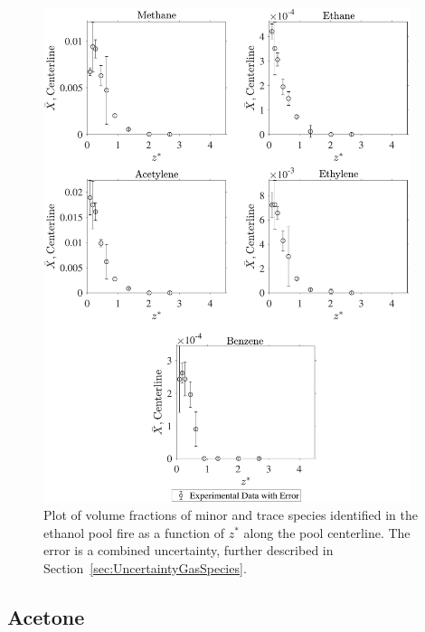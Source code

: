 \documentclass[12pt]{article}
\begin{document}
\begin{figure}[!h]
	\centering
\includegraphics[width=10.75cm,keepaspectratio]{Ethanol_Inter_MOL_FRAC_Plot.pdf}
	\caption[Volume fractions of minor and trace species in the ethanol plume]{Plot of volume fractions of minor and trace species identified in the ethanol pool fire as a function of $z^{*}$ along the pool centerline. The error is a combined uncertainty, further described in Section~\ref{sec:UncertaintyGasSpecies}.}
	\label{fig:Ethanol_VOL_Frac_Inter}
\end{figure}

\clearpage
\subsection{Acetone}
\label{ssec:Acetonel_ALL_Vol_Frac}
\end{document}
